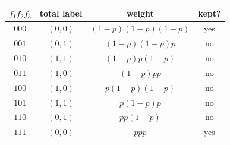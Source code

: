 \begin{tabular}{cccc}\toprule
$f_1f_2f_3$ & total label & weight & kept? \\\midrule
$000$ & $(0,0)$ & $(1-p)(1-p)(1-p)$ & yes \\
$001$ & $(0,1)$ & $(1-p)(1-p)p$ & no \\
$010$ & $(1,1)$ & $(1-p)p(1-p)$ & no \\
$011$ & $(1,0)$ & $(1-p)pp$ & no \\
$100$ & $(1,0)$ & $p(1-p)(1-p)$ & no \\
$101$ & $(1,1)$ & $p(1-p)p$ & no \\
$110$ & $(0,1)$ & $pp(1-p)$ & no \\
$111$ & $(0,0)$ & $ppp$ & yes \\
\bottomrule\end{tabular}
